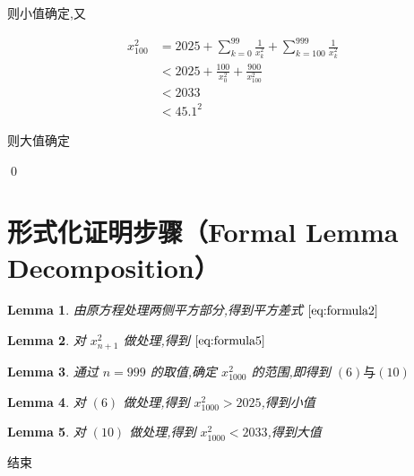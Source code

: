 \documentclass[11pt]{article}
\newtheorem{lemma}{Lemma}
\begin{document}
则小值确定,又

\begin{align}
x_{100}^2 & = 2025 + \sum_{k=0}^{99}\frac{1}{x_k^2} + \sum_{k=100}^{999}\frac{1}{x_k^2} \\
& < 2025 + \frac{100}{x_0^2} + \frac{900}{x_100^2} \\
& < 2033 \\ 
& < 45.1^2
\end{align}

则大值确定

\qed


\section*{形式化证明步骤（Formal Lemma Decomposition）}

\begin{lemma}
    由原方程处理两侧平方部分,得到平方差式 $\eqref{eq:formula2}$
\end{lemma}

\begin{lemma}
    对 $x_{n+1}^2$ 做处理,得到 $\eqref{eq:formula5}$
\end{lemma}

\begin{lemma}
    通过 $n=999$ 的取值,确定 $x_{1000}^2$ 的范围,即得到 $(6) 与 (10)$
\end{lemma}

\begin{lemma}
    对 $(6)$ 做处理,得到 $x_{1000}^2 > 2025$,得到小值
\end{lemma}

\begin{lemma}
    对 $(10)$ 做处理,得到 $x_{1000}^2 < 2033$,得到大值
\end{lemma}

结束
\end{document}
